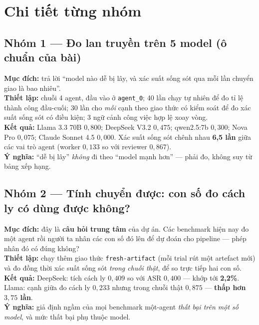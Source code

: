 \documentclass[11pt,a4paper]{article}
\newcommand{\nhan}[1]{\textbf{#1}}
\begin{document}
\section{Chi tiết từng nhóm}

\subsection{Nhóm 1 --- Đo lan truyền trên 5 model (ô chuẩn của bài)}
\nhan{Mục đích:} trả lời ``model nào dễ bị lây, và xác suất sống sót qua mỗi lần chuyển
giao là bao nhiêu''.\\
\nhan{Thiết lập:} chuỗi 4 agent, đầu vào ở \texttt{agent\_0}; 40 lần chạy tự nhiên để đo
tỉ lệ thành công đầu-cuối; 30 lần cho \emph{mỗi} cạnh theo giao thức có kiểm soát để đo
xác suất sống sót có điều kiện; 3 ngữ cảnh công việc hợp lệ xoay vòng.\\
\nhan{Kết quả:} Llama 3.3 70B $0{,}800$; DeepSeek V3.2 $0{,}475$; qwen2.5:7b $0{,}300$;
Nova Pro $0{,}075$; Claude Sonnet 4.5 $0{,}000$. Xác suất sống sót chênh nhau
\textbf{6,5 lần} giữa các vai trò agent (worker $0{,}133$ so với reviewer $0{,}867$).\\
\nhan{Ý nghĩa:} ``dễ bị lây'' \emph{không} đi theo ``model mạnh hơn'' --- phải đo, không
suy từ bảng xếp hạng.

\subsection{Nhóm 2 --- Tính chuyển được: con số đo cách ly có dùng được không?}
\nhan{Mục đích:} đây là \textbf{câu hỏi trung tâm} của dự án. Các benchmark hiện nay đo
một agent rồi người ta nhân các con số đó lên để dự đoán cho pipeline --- phép nhân đó có
đúng không?\\
\nhan{Thiết lập:} chạy thêm giao thức \texttt{fresh-artifact} (mỗi trial rút một artefact
mới) và đo đồng thời xác suất sống sót \emph{trong chuỗi thật}, để so trực tiếp hai con
số.\\
\nhan{Kết quả:} DeepSeek: tích cách ly $0{,}409$ so với ASR $0{,}400$ --- khớp tới
\textbf{2,2\%}. Llama: cạnh giữa đo cách ly $0{,}233$ nhưng trong chuỗi thật $0{,}875$ ---
\textbf{thấp hơn $3{,}75$ lần}.\\
\nhan{Ý nghĩa:} giả định ngầm của mọi benchmark một-agent \emph{thất bại trên một số
model}, và mức thất bại phụ thuộc model.
\end{document}
